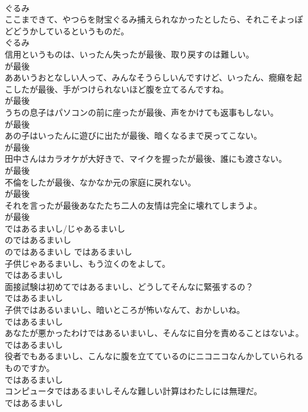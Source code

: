\documentclass[8pt]{extreport}
\begin{document}
\begin{CJK}{UTF8}{min}
\\	ぐるみ	
\\	ここまできて、やつらを財宝ぐるみ捕えられなかったとしたら、それこそよっぽどどうかしているというものだ。	
\\	ぐるみ	
\\	信用というものは、いったん失ったが最後、取り戻すのは難しい。	
\\	が最後	
\\	ああいうおとなしい人って、みんなそうらしいんですけど、いったん、癇癪を起こしたが最後、手がつけられないほど腹を立てるんですね。	
\\	が最後	
\\	うちの息子はパソコンの前に座ったが最後、声をかけても返事もしない。	
\\	が最後	
\\	あの子はいったんに遊びに出たが最後、暗くなるまで戻ってこない。	
\\	が最後	
\\	田中さんはカラオケが大好きで、マイクを握ったが最後、誰にも渡さない。	
\\	が最後	
\\	不倫をしたが最後、なかなか元の家庭に戻れない。	
\\	が最後	
\\	それを言ったが最後あなたたち二人の友情は完全に壊れてしまうよ。	
\\	が最後	
\\	ではあるまいし/じゃあるまいし	
\\	のではあるまいし	
\\	のではあるまいし	ではあるまいし	
\\	子供じゃあるまいし、もう泣くのをよして。	
\\	ではあるまいし	
\\	面接試験は初めてではあるまいし、どうしてそんなに緊張するの？	
\\	ではあるまいし	
\\	子供ではあるいまいし、暗いところが怖いなんて、おかしいね。	
\\	ではあるまいし	
\\	あなたが悪かったわけではあるいまいし、そんなに自分を責めることはないよ。	
\\	ではあるまいし	
\\	役者でもあるまいし、こんなに腹を立てているのにニコニコなんかしていられるものですか。	
\\	ではあるまいし	
\\	コンピュータではあるまいしそんな難しい計算はわたしには無理だ。	
\\	ではあるまいし	

\end{CJK}
\end{document}
